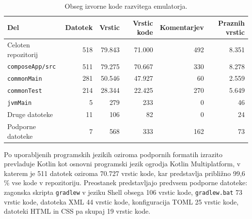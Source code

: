 \documentclass[a4paper, 12pt, openright]{book}
\begin{document}
    \begin{table}[htb]
        \begin{center}
            \small
            \setlength{\tabcolsep}{3pt}
            \begin{tabular}{|l|r|r|r|r|r|}
                \hline
                Del                                 & Datotek & Vrstic & Vrstic kode & Komentarjev & Praznih vrstic \\
                \hline
                Celoten repozitorij                 & 518     & 79.843 & 71.000      & 492         & 8.351          \\
                \hspace{1em}\texttt{composeApp/src} & 511     & 79.275 & 70.667      & 330         & 8.278          \\
                \hspace{2em}\texttt{commonMain}     & 281     & 50.546 & 47.927      & 60          & 2.559          \\
                \hspace{2em}\texttt{commonTest}     & 214     & 28.344 & 22.425      & 270         & 5.649          \\
                \hspace{2em}\texttt{jvmMain}        & 5       & 279    & 233         & 0           & 46             \\
                \hspace{2em}Druge datoteke          & 11      & 106    & 82          & 0           & 24             \\
                \hspace{1em}Podporne datoteke       & 7       & 568    & 333         & 162         & 73             \\
                \hline
            \end{tabular}
        \end{center}
        \caption{Obseg izvorne kode razvitega emulatorja.}
        \label{subspectrumsourcecode_tab1}
    \end{table}

    Po uporabljenih programskih jezikih oziroma podpornih formatih izrazito prevladuje
    Kotlin kot osnovni programski jezik ogrodja Kotlin Multiplatform, v katerem
    je 511 datotek oziroma 70.727 vrstic kode, kar predstavlja približno 99,6 \% vse
    kode v repozitoriju. Preostanek predstavljajo predvsem podporne datoteke: zagonska
    skripta \texttt{gradlew} v jeziku Shell obsega 106 vrstic kode, \texttt{gradlew.bat}
    73 vrstic kode, datoteka XML 44 vrstic kode, konfiguracija TOML 25 vrstic
    kode, datoteki HTML in CSS pa skupaj 19 vrstic kode.
\end{document}
